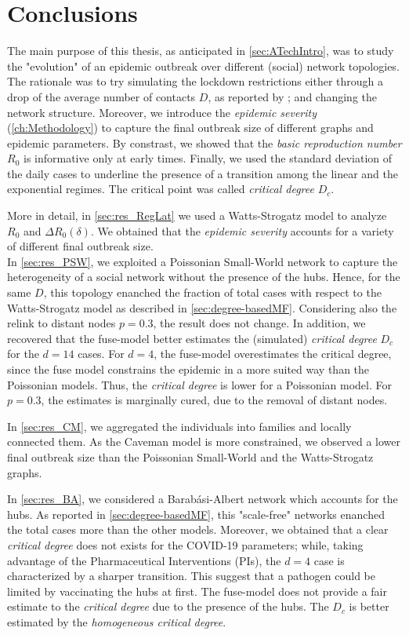\documentclass[a4paper,10pt,twoside]{book} %
\theoremstyle{definition}
\begin{document}
\chapter{Conclusions}

The main purpose of this thesis, as anticipated in \autoref{sec:ATechIntro}, was to study the "evolution" of an epidemic outbreak over different (social) network topologies. The rationale was to try simulating the lockdown restrictions either through a drop of the average number of contacts $D$, as reported by \cite{Liu::2021_Review_SContactPattern}; and changing the network structure.
Moreover, we introduce the \textit{epidemic severity} (\autoref{ch:Methodology}) to capture the final outbreak size of different graphs and epidemic parameters. By constrast, we showed that the \textit{basic reproduction number} $ R_0 $ is informative only at early times.
Finally, we used the standard deviation of the daily cases to underline the presence of a transition among the linear and the exponential regimes. The critical point was called \textit{critical degree}  $D_c$.

More in detail, in \autoref{sec:res_RegLat} we used a Watts-Strogatz model to analyze $ R_0$ and $ \Delta R_0 (\delta)$. We obtained that the \textit{epidemic severity} accounts for a variety of different final outbreak size.\\
In \autoref{sec:res_PSW}, we exploited a Poissonian Small-World network to capture the heterogeneity of a social network without the presence of the hubs. Hence, for the same $ D$, this topology enanched the fraction of total cases with respect to the Watts-Strogatz model as described in \autoref{sec:degree-basedMF}. Considering also the relink to distant nodes $ p = 0.3$, the result does not change.
In addition, we recovered that the fuse-model better estimates the (simulated) \textit{critical degree} $ D_c$ for the $ d = 14$ cases. For $d=4$, the fuse-model overestimates the critical degree, since the fuse model constrains the epidemic in a more suited way than the Poissonian models. Thus, the \textit{critical degree} is lower for a Poissonian model. For $ p = 0.3$, the estimates is marginally cured, due to the removal of distant nodes. 

In \autoref{sec:res_CM}, we aggregated the individuals into families and locally connected them.
As the Caveman model is more constrained, we observed a lower final outbreak size than the Poissonian Small-World and the Watts-Strogatz graphs.

In \autoref{sec:res_BA}, we considered a Barabási-Albert network which accounts for the hubs. As reported in \autoref{sec:degree-basedMF}, this "scale-free" networks enanched the total cases more than the other models. 
Moreover, we obtained that a clear \textit{critical degree} does not exists for the COVID-19 parameters; while, taking advantage of the Pharmaceutical Interventions (PIs), the $d = 4$ case is characterized by a sharper transition. This suggest that a pathogen could be limited by vaccinating the hubs at first.
The fuse-model does not provide a fair estimate to the \textit{critical degree} due to the presence of the hubs. The $ D_c$ is better estimated by the \textit{homogeneous critical degree}. 
\end{document}
